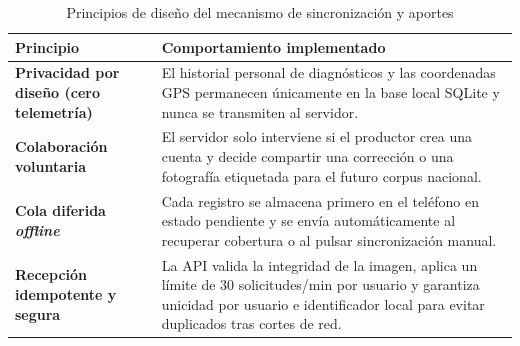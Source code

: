 \begin{table}[H]
\caption{Principios de dise\~no del mecanismo de sincronizaci\'on y aportes}
\label{tab:politicas_sync_c3}
\centering
\footnotesize
\begin{singlespace}
\renewcommand{\arraystretch}{1.12}
\begin{tabularx}{\textwidth}{@{}>{\raggedright\arraybackslash\bfseries}p{3.6cm}>{\raggedright\arraybackslash}X@{}}
\toprule
\textbf{Principio} & \textbf{Comportamiento implementado} \\
\midrule
Privacidad por dise\~no (cero telemetr\'ia) & El historial personal de diagn\'osticos y las coordenadas GPS permanecen \'unicamente en la base local SQLite y nunca se transmiten al servidor. \\
Colaboraci\'on voluntaria & El servidor solo interviene si el productor crea una cuenta y decide compartir una correcci\'on o una fotograf\'ia etiquetada para el futuro corpus nacional. \\
Cola diferida \textit{offline} & Cada registro se almacena primero en el tel\'efono en estado pendiente y se env\'ia autom\'aticamente al recuperar cobertura o al pulsar sincronizaci\'on manual. \\
Recepci\'on idempotente y segura & La API valida la integridad de la imagen, aplica un l\'imite de 30 solicitudes/min por usuario y garantiza unicidad por usuario e identificador local para evitar duplicados tras cortes de red. \\
\bottomrule
\end{tabularx}
\end{singlespace}
\end{table}

